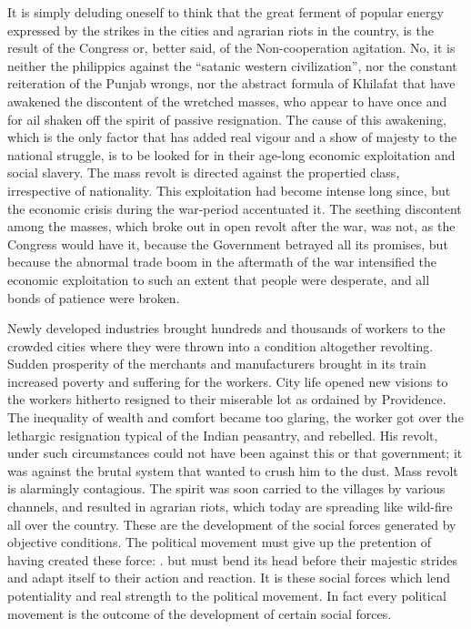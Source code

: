 It is simply deluding oneself to think that the great ferment of popular energy expressed by the strikes in the cities and agrarian riots in the country, is the result of the Congress or, better said, of the Non-cooperation agitation. No, it is neither the philippics against the “satanic western civilization”, nor the constant reiteration of the Punjab wrongs, nor the abstract formula of Khilafat that have awakened the 
discontent of the wretched masses, who appear to have once and for ail shaken off the spirit of passive resignation. The cause of this awakening, which is the only factor that has added real vigour and a show of majesty to the national struggle, is to be looked for in their age-long economic exploitation and social slavery. The mass revolt is directed against the propertied class, irrespective of nationality. This 
exploitation had become intense long since, but the economic crisis during the war-period accentuated it. The seething discontent among the masses, which broke out in open revolt after the war, was not, as the Congress would have it, because the Government betrayed all its promises, but because the abnormal trade boom in the aftermath of the war intensified the economic exploitation to such an extent that people were desperate, and all bonds of patience were broken. 

Newly developed industries brought hundreds and thousands of workers to the crowded cities where they were thrown into a condition altogether revolting. Sudden prosperity of the merchants and manufacturers brought in its train increased poverty and suffering for the workers. City life
opened new visions to the workers hitherto resigned to their miserable lot as ordained by Providence. The inequality of wealth and comfort became too glaring, the worker got over the lethargic resignation typical of the Indian peasantry, and rebelled. His revolt, under such circumstances could not have been against this or that government; it was against the brutal system that wanted to crush him to the dust. Mass revolt is alarmingly contagious. The spirit was soon carried to the villages by various channels, and resulted in agrarian riots, which today are spreading like wild-fire all over the country. These are the development of the social forces generated by objective conditions. The political movement must give up the pretention of having created these force: . but must bend its head before their majestic strides and adapt itself to their action and reaction. It is these social forces which lend potentiality and real strength to the political movement. In 
fact every political movement is the outcome of the development of certain social forces.   

